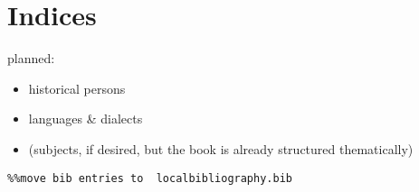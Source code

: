 \section{Indices}
\hypertarget{Toc19704873}{}
planned:

\begin{itemize}
\item \begin{styleListParagraph}
historical persons
\end{styleListParagraph}
\item \begin{styleListParagraph}
languages \& dialects
\end{styleListParagraph}
\item \begin{styleListParagraph}
(subjects, if desired, but the book is already structured thematically)
\end{styleListParagraph}
\end{itemize}

\begin{verbatim}%%move bib entries to  localbibliography.bib
\end{verbatim}